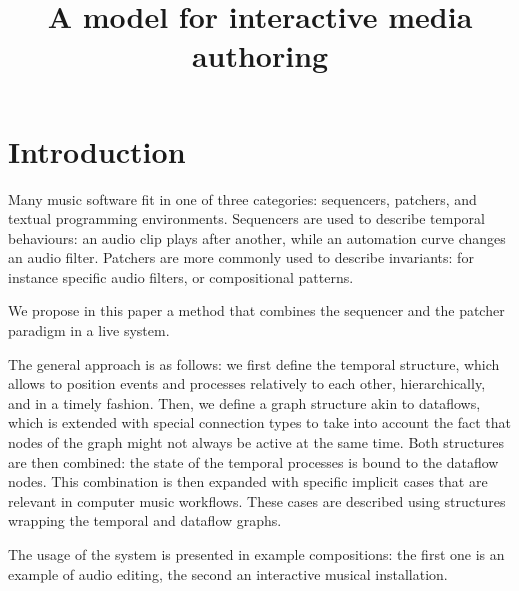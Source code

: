 \documentclass[applsci,article,submit,moreauthors,pdftex,10pt,a4paper]{mdpi}
\title{A model for interactive media authoring}
\begin{document}
\section{Introduction}
Many music software fit in one of three categories: sequencers, patchers, and textual programming environments. Sequencers are used to describe temporal behaviours: an audio clip plays after another, while an automation curve changes an audio filter. Patchers are more commonly used to describe invariants: for instance specific audio filters, or compositional patterns. 

We propose in this paper a method that combines the sequencer and the patcher paradigm in a live system.  

The general approach is as follows: we first define the temporal structure, which allows to position events and processes relatively to each other, hierarchically, and in a timely fashion. Then, we define a graph structure akin to dataflows, which is extended with special connection types to take into account the fact that nodes of the graph might not always be active at the same time. Both structures are then combined: the state of the temporal processes is bound to the dataflow nodes. This combination is then expanded with specific implicit cases that are relevant in computer music workflows. These cases are described using structures wrapping the temporal and dataflow graphs.

The usage of the system is presented in example compositions: the first one is an example of audio editing, the second an interactive musical installation.





\end{document}
